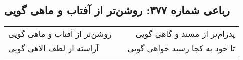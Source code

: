 \begin{center}
\section*{رباعی شماره ۳۷۷: روشن‌تر از آفتاب و ماهی گویی}
\label{sec:sh377}
\begin{longtable}{l p{0.5cm} r}
روشن‌تر از آفتاب و ماهی گویی
&&
پدرام‌تر از مسند و گاهی گویی
\\
آراسته از لطف الاهی گویی
&&
تا خود به کجا رسید خواهی گویی
\\
\end{longtable}
\end{center}

